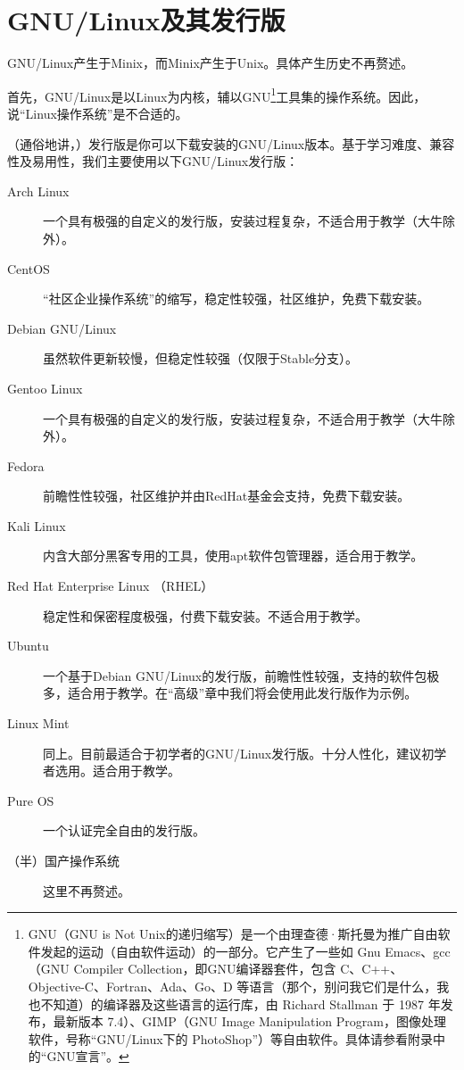 \documentclass{book}
\begin{document}
\section{GNU/Linux及其发行版}
\label{sec:gnulinux} GNU/Linux产生于Minix，而Minix产生于Unix。具体产生历史不再赘述。\par
首先，GNU/Linux是以Linux为内核，辅以GNU\footnote{GNU（GNU is Not Unix的递归缩写）是一个由理查德·斯托曼为推广自由软件发起的运动（自由软件运动）的一部分。它产生了一些如 Gnu Emacs、gcc（GNU Compiler Collection，即GNU编译器套件，包含 C、C++、Objective-C、Fortran、Ada、Go、D 等语言（那个，别问我它们是什么，我也不知道）的编译器及这些语言的运行库，由 Richard Stallman 于 1987 年发布，最新版本 7.4）、GIMP（GNU Image Manipulation Program，图像处理软件，号称“GNU/Linux下的 PhotoShop”）等自由软件。具体请参看附录中的“GNU宣言”。}工具集的操作系统。因此，说“Linux操作系统”是不合适的。\par
（通俗地讲，）发行版是你可以下载安装的GNU/Linux版本。基于学习难度、兼容性及易用性，我们主要使用以下GNU/Linux发行版：
\begin{description}
	\item [Arch Linux] 一个具有极强的自定义的发行版，安装过程复杂，不适合用于教学（大牛除外）。
	\item [CentOS] “社区企业操作系统”的缩写，稳定性较强，社区维护，免费下载安装。
	\item [Debian GNU/Linux] 虽然软件更新较慢，但稳定性较强（仅限于Stable分支）。
	\item [Gentoo Linux] 一个具有极强的自定义的发行版，安装过程复杂，不适合用于教学（大牛除外）。
	\item [Fedora] 前瞻性性较强，社区维护并由RedHat基金会支持，免费下载安装。
	\item [Kali Linux] 内含大部分黑客专用的工具，使用apt软件包管理器，适合用于教学。
	\item [Red Hat Enterprise Linux （RHEL）] 稳定性和保密程度极强，付费下载安装。不适合用于教学。
	\item [Ubuntu] 一个基于Debian GNU/Linux的发行版，前瞻性性较强，支持的软件包极多，适合用于教学。在“高级”章中我们将会使用此发行版作为示例。
	\item [Linux Mint] 同上。目前最适合于初学者的GNU/Linux发行版。十分人性化，建议初学者选用。适合用于教学。
	\item [Pure OS] 一个认证完全自由的发行版。
	\item [（半）国产操作系统]这里不再赘述。
\end{description}
\end{document}
